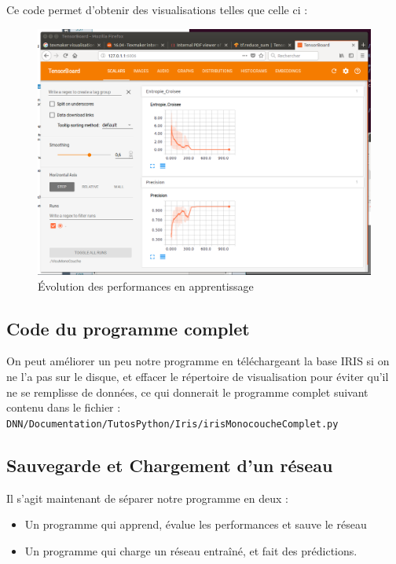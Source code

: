 \documentclass[a4paper,11pt]{book}
\begin{document}
Ce code permet d'obtenir des visualisations telles que celle ci :
\begin{figure}[H]
\begin{center}
\includegraphics[width=15cm]{./figures/scalarIrisMono.png} 
\end{center}
\caption{Évolution des performances en apprentissage}
\end{figure}




\subsection{Code du programme complet}
On peut améliorer un peu notre programme en téléchargeant la base IRIS si on ne l'a pas sur le disque, et effacer le répertoire de visualisation pour éviter qu'il ne se remplisse de données, ce qui donnerait le programme complet suivant contenu dans le fichier :\\
\verb+DNN/Documentation/TutosPython/Iris/irisMonocoucheComplet.py+



\subsection{Sauvegarde et Chargement d'un réseau }
\label{sec:irisMonocoucheSave}
Il s'agit maintenant de séparer notre programme en deux :
\begin{itemize}
\item Un programme qui apprend, évalue les performances et sauve le réseau
\item Un programme qui charge un réseau entraîné, et fait des prédictions.
\end{itemize}
\end{document}
